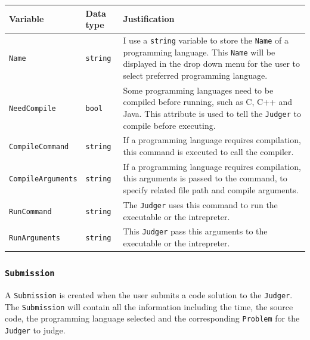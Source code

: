 \documentclass[a4paper]{report}
\begin{document}
\begin{tabulary}{\textwidth}{|l|l|L|}
    \hline
    Variable & Data type & Justification \\
    \hline
    \texttt{Name} & \texttt{string} & I use a \texttt{string} variable to store the \texttt{Name} of a programming language. This \texttt{Name} will be displayed in the drop down menu for the user to select preferred programming language. \\
    \hline
    \texttt{NeedCompile} & \texttt{bool} & Some programming languages need to be compiled before running, such as C, C++ and Java. This attribute is used to tell the \texttt{Judger} to compile before executing. \\
    \hline
    \texttt{CompileCommand} & \texttt{string} & If a programming language requires compilation, this command is executed to call the compiler. \\
    \hline
    \texttt{CompileArguments} & \texttt{string} & If a programming language requires compilation, this arguments is passed to the command, to specify related file path and compile arguments. \\
    \hline
    \texttt{RunCommand} & \texttt{string} & The \texttt{Judger} uses this command to run the executable or the intrepreter. \\
    \hline
    \texttt{RunArguments} & \texttt{string} & This \texttt{Judger} pass this arguments to the executable or the intrepreter. \\
    \hline
\end{tabulary}

\subsubsection{\texttt{Submission}}

A \texttt{Submission} is created when the user submits a code solution to the \texttt{Judger}. The \texttt{Submission} will contain all the information including the time, the source code, the programming language selected and the corresponding \texttt{Problem} for the \texttt{Judger} to judge.
\end{document}
